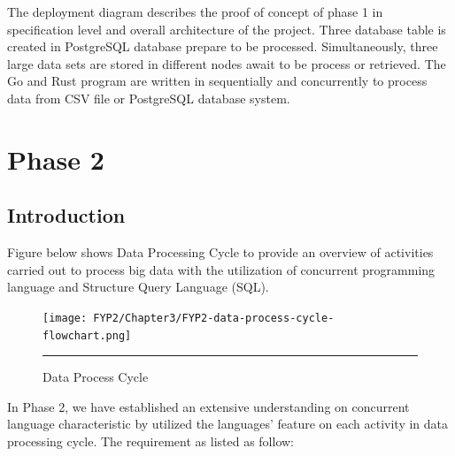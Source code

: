 The deployment diagram describes the proof of concept of phase 1 in specification level and overall architecture of the project. Three database table is created in PostgreSQL database prepare to be processed. Simultaneously, three large data sets are stored in different nodes await to be process or retrieved. The Go and Rust program are written in sequentially and concurrently to process data from CSV file or PostgreSQL database system.

\section{Phase 2}

\subsection{Introduction}

Figure below shows Data Processing Cycle to provide an overview of activities carried out to process big data with the utilization of concurrent programming language and Structure Query Language (SQL).

\begin{figure}[H]
	\centering
	\texttt{[image: FYP2/Chapter3/FYP2-data-process-cycle-flowchart.png]}
	\rule{35em}{0.5pt}
	\caption[Data Process Cycle]{Data Process Cycle}
\end{figure} 

In Phase 2, we have established an extensive understanding on concurrent language characteristic by utilized the languages' feature on each activity in data processing cycle. The requirement as listed as follow: 

